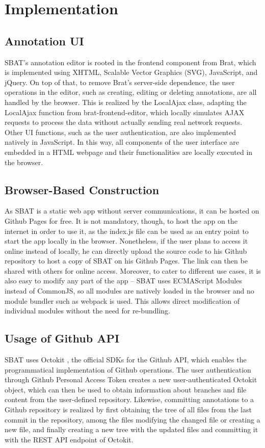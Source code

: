 \documentclass[12ptm a4paper]{article}
\begin{document}
\section{Implementation}
\subsection{Annotation UI}
SBAT's annotation editor is rooted in the frontend component from Brat, which is implemented using XHTML, Scalable Vector Graphics (SVG), JavaScript, and jQuery. On top of that, to remove Brat's server-side dependence, the user operations in the editor, such as creating, editing or deleting annotations, are all handled by the browser. This is realized by the LocalAjax class, adapting the LocalAjax function from brat-frontend-editor, which locally simulates AJAX requests to process the data without actually sending real network requests. Other UI functions, such as the user authentication, are also implemented natively in JavaScript. In this way, all components of the user interface are embedded in a HTML webpage and their functionalities are locally executed in the browser.
\subsection{Browser-Based Construction}
As SBAT is a static web app without server communications, it can be hosted on Github Pages for free. It is not mandatory, though, to host the app on the internet in order to use it, as the index.js file can be used as an entry point to start the app locally in the browser. Nonetheless, if the user plans to access it online instead of locally, he can directly upload the source code to his Github repository to host a copy of SBAT on his Github Pages. The link can then be shared with others for online access. Moreover, to cater to different use cases, it is also easy to modify any part of the app -- SBAT uses ECMAScript Modules instead of CommonJS, so all modules are natively loaded in the browser and no module bundler such as webpack is used. This allows direct modification of individual modules without the need for re-bundling.
\subsection{Usage of Github API}
SBAT uses Octokit \cite{octokit.js}, the official SDKs for the Github API, which enables the programmatical implementation of Github operations. The user authentication through Github Personal Access Token creates a new user-authenticated Octokit object, which can then be used to obtain information about branches and file content from the user-defined repository. Likewise, committing annotations to a Github repository is realized by first obtaining the tree of all files from the last commit in the repository, among the files modifying the changed file or creating a new file, and finally creating a new tree with the updated files and committing it with the REST API endpoint of Octokit.
\end{document}
